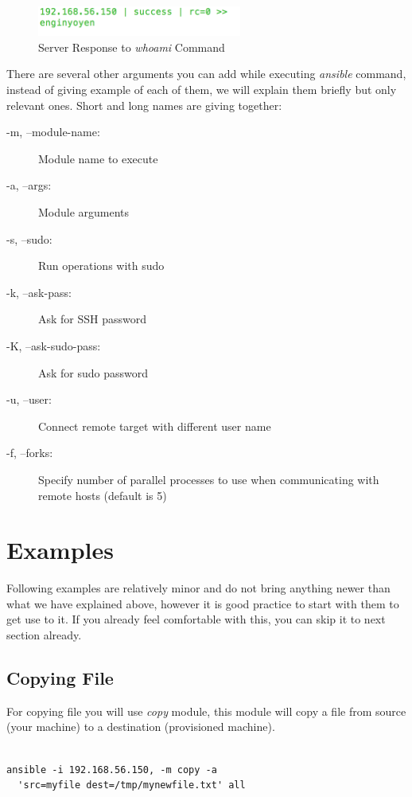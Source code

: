 \documentclass[10pt]{book}
\begin{document}
\begin{figure}[ht]
	\centering
  \includegraphics[width=0.6\textwidth]{figures/command-execution-whoami.png}
	\caption{Server Response to \emph{whoami}  Command}
\end{figure}


There are several other arguments you can add while executing \emph{ansible}  
command, instead of giving example of each of them, we will explain them 
briefly but only relevant ones. Short and long names are giving together:

\begin{description}
\item[-m, --module-name:] Module name to execute
\item[-a, --args:]  Module arguments
\item[-s, --sudo:]  Run operations with sudo 
\item[-k, --ask-pass:] Ask for SSH password
\item[-K, --ask-sudo-pass:] Ask for sudo password
\item[-u, --user:] Connect remote target with different user name
\item[-f, --forks:]  Specify number of parallel processes to use when communicating with remote hosts 
(default is 5)

\end{description}

\section{Examples}
Following examples are relatively minor and do not bring anything newer than 
what we have explained above, however it is good practice to start with them to 
get use to it. If you already feel comfortable with this, you can skip it to 
next section already.

\subsection{Copying File}
For copying file you will use \emph{copy} module, this module will copy a file 
from source (your machine) to a destination (provisioned machine). 

\begin{Verbatim}

ansible -i 192.168.56.150, -m copy -a  
  'src=myfile dest=/tmp/mynewfile.txt' all
 
\end{Verbatim}
\end{document}
